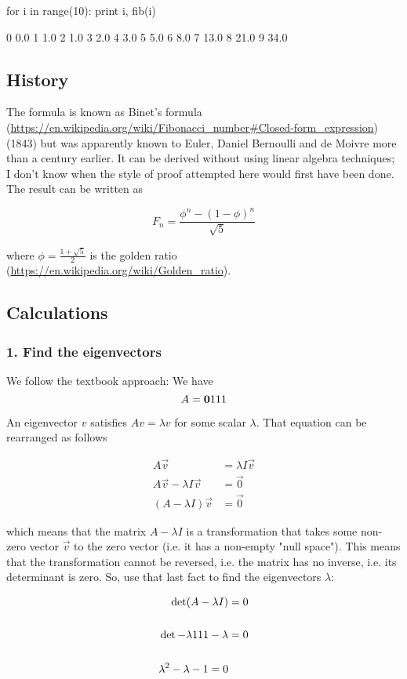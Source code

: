     for i in range(10):
        print i, fib(i)

    0 0.0
    1 1.0
    2 1.0
    3 2.0
    4 3.0
    5 5.0
    6 8.0
    7 13.0
    8 21.0
    9 34.0

\subsection{History}

The formula is known as
Binet's formula (\url{https://en.wikipedia.org/wiki/Fibonacci_number#Closed-form_expression})
(1843) but was apparently known to Euler, Daniel Bernoulli and de Moivre more
than a century earlier. It can be derived without using linear algebra
techniques; I don't know when the style of proof attempted here would first
have been done. The result can be written as

$$
F_n = \frac{\phi^n - (1-\phi)^n}{\sqrt{5}}
$$

where $\phi = \frac{1+\sqrt{5}}{2}$ is the
golden ratio (\url{https://en.wikipedia.org/wiki/Golden_ratio}).


\subsection{Calculations}

\subsubsection{1. Find the eigenvectors}
We follow the textbook approach: We have
$$
A = \mathbf{0}{1}
        {1}{1}
$$

An eigenvector $v$ satisfies $Av = \lambda v$ for some scalar $\lambda$. That
equation can be rearranged as follows

\begin{align*}
A\vec v &= \lambda I\vec v
\\
A\vec v - \lambda I\vec v &= \vec 0
\\
(A - \lambda I)\vec v &= \vec 0
\end{align*}

which means that the matrix $A - \lambda I$ is a transformation that takes some
non-zero vector $\vec v$ to the zero vector (i.e. it has a non-empty "null
space"). This means that the transformation cannot be reversed, i.e. the matrix
has no inverse, i.e. its determinant is zero. So, use that last fact to find
the eigenvectors $\lambda$:

\begin{align*}
\det (A - \lambda I) &= 0
\\
\\
\det \mathbf{-\lambda}{1}
         {1          }{1 - \lambda} &= 0
\\
\\
\lambda^2 - \lambda - 1 = 0
\end{align*}

